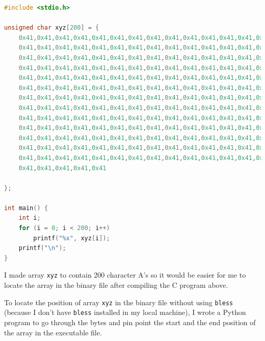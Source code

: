 \documentclass{article}
\begin{document}
\begin{lstlisting}[language=c]
#include <stdio.h>

unsigned char xyz[200] = {
    0x41,0x41,0x41,0x41,0x41,0x41,0x41,0x41,0x41,0x41,0x41,0x41,0x41,0x41,0x41,
    0x41,0x41,0x41,0x41,0x41,0x41,0x41,0x41,0x41,0x41,0x41,0x41,0x41,0x41,0x41,
    0x41,0x41,0x41,0x41,0x41,0x41,0x41,0x41,0x41,0x41,0x41,0x41,0x41,0x41,0x41,
    0x41,0x41,0x41,0x41,0x41,0x41,0x41,0x41,0x41,0x41,0x41,0x41,0x41,0x41,0x41,
    0x41,0x41,0x41,0x41,0x41,0x41,0x41,0x41,0x41,0x41,0x41,0x41,0x41,0x41,0x41,
    0x41,0x41,0x41,0x41,0x41,0x41,0x41,0x41,0x41,0x41,0x41,0x41,0x41,0x41,0x41,
    0x41,0x41,0x41,0x41,0x41,0x41,0x41,0x41,0x41,0x41,0x41,0x41,0x41,0x41,0x41,
    0x41,0x41,0x41,0x41,0x41,0x41,0x41,0x41,0x41,0x41,0x41,0x41,0x41,0x41,0x41,
    0x41,0x41,0x41,0x41,0x41,0x41,0x41,0x41,0x41,0x41,0x41,0x41,0x41,0x41,0x41,
    0x41,0x41,0x41,0x41,0x41,0x41,0x41,0x41,0x41,0x41,0x41,0x41,0x41,0x41,0x41,
    0x41,0x41,0x41,0x41,0x41,0x41,0x41,0x41,0x41,0x41,0x41,0x41,0x41,0x41,0x41,
    0x41,0x41,0x41,0x41,0x41,0x41,0x41,0x41,0x41,0x41,0x41,0x41,0x41,0x41,0x41,
    0x41,0x41,0x41,0x41,0x41,0x41,0x41,0x41,0x41,0x41,0x41,0x41,0x41,0x41,0x41,
    0x41,0x41,0x41,0x41,0x41

};

int main() {
    int i;
    for (i = 0; i < 200; i++)
        printf("%x", xyz[i]);
    printf("\n");
}
\end{lstlisting}

I made array \texttt{xyz} to contain 200 character A's so it would be easier for
me to locate the array in the binary file after compiling the C program above.

To locate the position of array \texttt{xyz} in the binary file without using
\texttt{bless} (because I don't have \texttt{bless} installed in my local machine),
I wrote a Python program to go through the bytes and pin point the start and the
end position of the array in the executable file.
\end{document}

